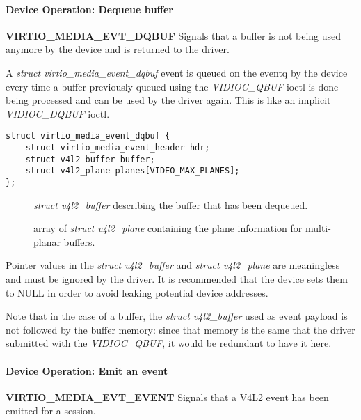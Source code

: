\paragraph{Device Operation: Dequeue buffer}
\label{sec:Device Types / Media Device / Device Operation / Dequeue buffer}

\textbf{VIRTIO_MEDIA_EVT_DQBUF} Signals that a buffer is not being used anymore
by the device and is returned to the driver.

A \textit{struct virtio_media_event_dqbuf} event is queued on the eventq by the
device every time a buffer previously queued using the \textit{VIDIOC_QBUF}
ioctl is done being processed and can be used by the driver again. This is like
an implicit \textit{VIDIOC_DQBUF} ioctl.

\begin{lstlisting}
struct virtio_media_event_dqbuf {
    struct virtio_media_event_header hdr;
    struct v4l2_buffer buffer;
    struct v4l2_plane planes[VIDEO_MAX_PLANES];
};
\end{lstlisting}

\begin{description}
\item[] \textit{struct v4l2_buffer} describing the buffer that has been dequeued.
\item[] array of \textit{struct v4l2_plane} containing the plane information for multi-planar buffers.
\end{description}

Pointer values in the \textit{struct v4l2_buffer} and \textit{struct v4l2_plane}
are meaningless and must be ignored by the driver. It is recommended that the
device sets them to NULL in order to avoid leaking potential device addresses.

Note that in the case of a  buffer, the \textit{struct v4l2_buffer}
used as event payload is not followed by the buffer memory: since that memory
is the same that the driver submitted with the \textit{VIDIOC_QBUF}, it would
be redundant to have it here.

\paragraph{Device Operation: Emit an event}
\label{sec:Device Types / Media Device / Device Operation / Emit an event}

\textbf{VIRTIO_MEDIA_EVT_EVENT} Signals that a V4L2 event has been emitted for a session.

